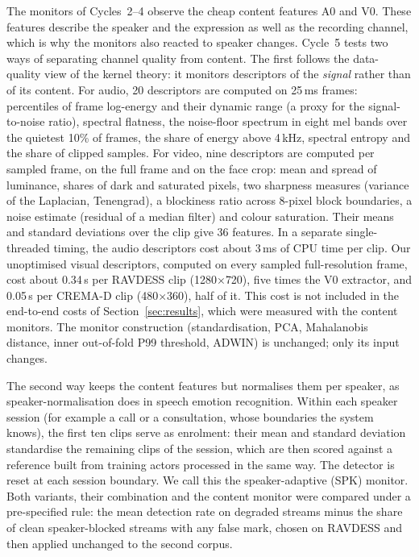 The monitors of Cycles~2--4 observe the cheap content features A0 and V0. These features describe the speaker and the expression as well as the recording channel, which is why the monitors also reacted to speaker changes. Cycle~5 tests two ways of separating channel quality from content. The first follows the data-quality view of the kernel theory: it monitors descriptors of the \emph{signal} rather than of its content. For audio, 20 descriptors are computed on 25\,ms frames: percentiles of frame log-energy and their dynamic range (a proxy for the signal-to-noise ratio), spectral flatness, the noise-floor spectrum in eight mel bands over the quietest 10\% of frames, the share of energy above 4\,kHz, spectral entropy and the share of clipped samples. For video, nine descriptors are computed per sampled frame, on the full frame and on the face crop: mean and spread of luminance, shares of dark and saturated pixels, two sharpness measures (variance of the Laplacian, Tenengrad), a blockiness ratio across 8-pixel block boundaries, a noise estimate (residual of a median filter) and colour saturation. Their means and standard deviations over the clip give 36 features. In a separate single-threaded timing, the audio descriptors cost about 3\,ms of CPU time per clip. Our unoptimised visual descriptors, computed on every sampled full-resolution frame, cost about 0.34\,s per RAVDESS clip (1280$\times$720), five times the V0 extractor, and 0.05\,s per CREMA-D clip (480$\times$360), half of it. This cost is not included in the end-to-end costs of Section~\ref{sec:results}, which were measured with the content monitors. The monitor construction (standardisation, PCA, Mahalanobis distance, inner out-of-fold P99 threshold, ADWIN) is unchanged; only its input changes.

The second way keeps the content features but normalises them per speaker, as speaker-normalisation does in speech emotion recognition. Within each speaker session (for example a call or a consultation, whose boundaries the system knows), the first ten clips serve as enrolment: their mean and standard deviation standardise the remaining clips of the session, which are then scored against a reference built from training actors processed in the same way. The detector is reset at each session boundary. We call this the speaker-adaptive (SPK) monitor. Both variants, their combination and the content monitor were compared under a pre-specified rule: the mean detection rate on degraded streams minus the share of clean speaker-blocked streams with any false mark, chosen on RAVDESS and then applied unchanged to the second corpus.
